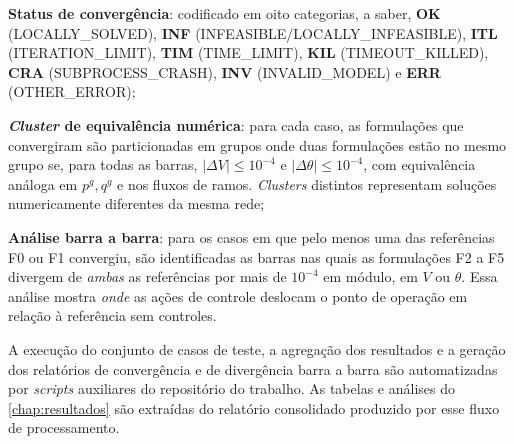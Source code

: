 \begin{alineascomnumero}
    \item \textbf{Status de convergência}: codificado em oito categorias, a saber, \textbf{OK} (LOCALLY\_SOLVED), \textbf{INF} (INFEASIBLE/LOCALLY\_INFEASIBLE), \textbf{ITL} (ITERATION\_LIMIT), \textbf{TIM} (TIME\_LIMIT), \textbf{KIL} (TIMEOUT\_KILLED), \textbf{CRA} (SUBPROCESS\_CRASH), \textbf{INV} (INVALID\_MODEL) e \textbf{ERR} (OTHER\_ERROR);
    \item \textbf{\textit{Cluster} de equivalência numérica}: para cada caso, as formulações que convergiram são particionadas em grupos onde duas formulações estão no mesmo grupo se, para todas as barras, $|\Delta V| \le 10^{-4}$ e $|\Delta \theta| \le 10^{-4}$, com equivalência análoga em $p^g, q^g$ e nos fluxos de ramos. \textit{Clusters} distintos representam soluções numericamente diferentes da mesma rede;
    \item \textbf{Análise barra a barra}: para os casos em que pelo menos uma das referências F0 ou F1 convergiu, são identificadas as barras nas quais as formulações F2 a F5 divergem de \emph{ambas} as referências por mais de $10^{-4}$ em módulo, em $V$ ou $\theta$. Essa análise mostra \emph{onde} as ações de controle deslocam o ponto de operação em relação à referência sem controles.
\end{alineascomnumero}

A execução do conjunto de casos de teste, a agregação dos resultados e a geração dos relatórios de convergência e de divergência barra a barra são automatizadas por \textit{scripts} auxiliares do repositório do trabalho. As tabelas e análises do \autoref{chap:resultados} são extraídas do relatório consolidado produzido por esse fluxo de processamento.
